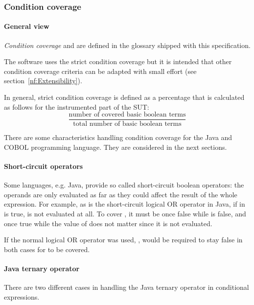 \subsubsection{Condition coverage}
\paragraph{General view}
\textit{Condition coverage} and \textit{} are defined in the glossary shipped with this specification.
\par
The software uses the strict condition coverage but it is intended that other condition coverage criteria can be adapted with small effort (see section~\ref{nf:Extensibility}).
\par
In general, strict condition coverage is defined  as a percentage that is calculated as follows for the instrumented part of the SUT:
\begin{equation*}
\frac{\text{number of covered basic boolean terms}}{\text{total number of basic boolean terms}}
\end{equation*}
\par
There are some characteristics handling condition coverage for the Java and COBOL programming language. They are considered in the next sections.

\paragraph{Short-circuit operators}
Some languages, e.g. Java, provide so called short-circuit boolean operators: the operands are only evaluated as far as they could affect the result of the whole expression. For example, as \code{||} is the short-circuit logical OR operator in Java, if  in  is true,  is not evaluated at all. To cover , it must be once false while  is false, and once true while the
value of  does not matter since it is not evaluated.

If the normal logical OR operator \code {|} was used, ,  would be required to stay false in both cases for  to be covered.

\paragraph{Java ternary operator}
There are two different cases in handling the Java ternary operator  in conditional expressions. 


